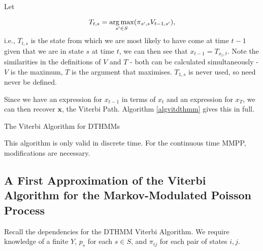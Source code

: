 Let
 
$$
T_{t,s} = \operatorname*{arg\,max}_{s'\in S}(\pi_{s',s}V_{t-1,s'}),
$$
i.e., $T_{t,s}$ is the state from which we are most likely to have come at time $t-1$ given that we are in state $s$ at time $t$, we can then see that $x_{t-1} = T_{x_t,t}$. Note the similarities in the definitions of $V$ and $T$ - both can be calculated simultaneously - $V$ is the maximum, $T$ is the argument that maximises. $T_{1,s}$ is never used, so need never be defined. 

Since we have an expression for $x_{t-1}$ in terms of $x_t$ and an expression for $x_T$, we can then recover $\mathbf{x}$, the Viterbi Path. Algorithm \ref{algvitdthmm} gives this in full.

\begin{algorithm}
\SetAlgoLined
{}

\caption{The Viterbi Algorithm for DTHMMs}\label{algvitdthmm}

\end{algorithm}

This algorithm is only valid in discrete time. For the continuous time MMPP, modifications are necessary.

\subsection{A First Approximation of the Viterbi Algorithm for the Markov-Modulated Poisson Process}

Recall the dependencies for the DTHMM Viterbi Algorithm. We require knowledge of a finite $Y$, $p_s$ for each $s\in S$, and $\pi_{ij}$ for each pair of states $i,j$.

